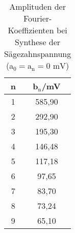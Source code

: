 \begin{table}[h]
	\begin{center}
		\begin{tabular}{cc}
			n&b$_\text{n}$/mV \\ \hline
			1&585,90\\
			2&292,90\\
			3&195,30\\
			4&146,48\\
			5&117,18\\
			6&97,65\\
			7&83,70\\
			8&73,24\\
			9&65,10
		\end{tabular}
		\caption{Amplituden der Fourier-Koeffizienten bei Synthese der Sägezahnspannung (a$_\text{0}=\text{a}_\text{n}=0\text{ mV}$)}
		\label{tabfss}
	\end{center}
\end{table}